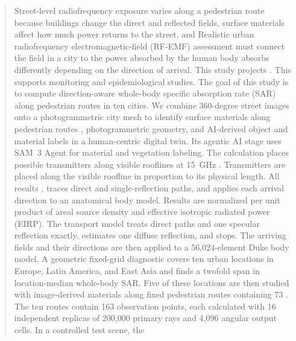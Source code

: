 \documentclass{IEEEoj} %
\providecommand{\DIFadd}[1]{{\protect\color{blue} \sf #1}} %
\providecommand{\DIFdel}[1]{{\protect\color{red} \scriptsize #1}} %
\providecommand{\DIFaddbegin}{} %
\providecommand{\DIFaddend}{} %
\providecommand{\DIFdelbegin}{} %
\providecommand{\DIFdelend}{} %
\begin{document}
\DIFdelbegin %

\DIFdelend \begin{abstract}
\DIFdelbegin \DIFdel{Street-level radiofrequency exposure varies along a pedestrian route because
buildings change the direct and reflected fields, surface materials affect how
much power returns to the street, and }\DIFdelend \DIFaddbegin \DIFadd{Realistic urban radiofrequency electromagnetic-field (RF-EMF) assessment must
connect the field in a city to the power absorbed by }\DIFaddend the human body\DIFdelbegin \DIFdel{absorbs differently
depending on the direction of arrival. This
study projects }\DIFdelend \DIFaddbegin \DIFadd{. This
supports monitoring and epidemiological studies. The goal of
this study is to compute direction-aware whole-body specific absorption rate
(SAR) along pedestrian routes in ten cities. We combine }\DIFaddend 360-degree street
images\DIFdelbegin \DIFdel{onto a photogrammetric city mesh to identify surface materials along pedestrian routes }\DIFdelend \DIFaddbegin \DIFadd{, photogrammetric geometry, and AI-derived object and material labels in
a human-centric digital twin. Its agentic AI stage uses SAM~3 Agent for
material and vegetation labeling. The calculation places possible transmitters
along visible rooflines }\DIFaddend at 15~GHz\DIFdelbegin \DIFdel{. Transmitters are placed along the visible
roofline in proportion to its physical length. All results }\DIFdelend \DIFaddbegin \DIFadd{, traces direct and single-reflection paths,
and applies each arrival direction to an anatomical body model. Results }\DIFaddend are
normalized per unit product of \DIFdelbegin \DIFdel{areal }\DIFdelend source density and effective isotropic radiated
power\DIFdelbegin \DIFdel{(EIRP). The transport model treats direct
paths and one specular reflection exactly, estimates one diffuse reflection, and
stops. The arriving fields and their directions are then applied to a
56,024-element Duke body model. A geometric fixed-grid diagnostic covers ten urban locations in Europe, Latin America, and East Asia and finds a twofold
span in location-median whole-body SAR. Five of these locations are then studied
with image-derived materials along fixed pedestrian routes containing 73
}\DIFdelend \DIFaddbegin \DIFadd{. The ten routes contain 163 }\DIFaddend observation points, each \DIFdelbegin \DIFdel{calculated with 16 independent replicas of 200,000
primary rays and 4,096 angular output cells. In a controlled test scene, the
}
\end{abstract}
\end{document}

